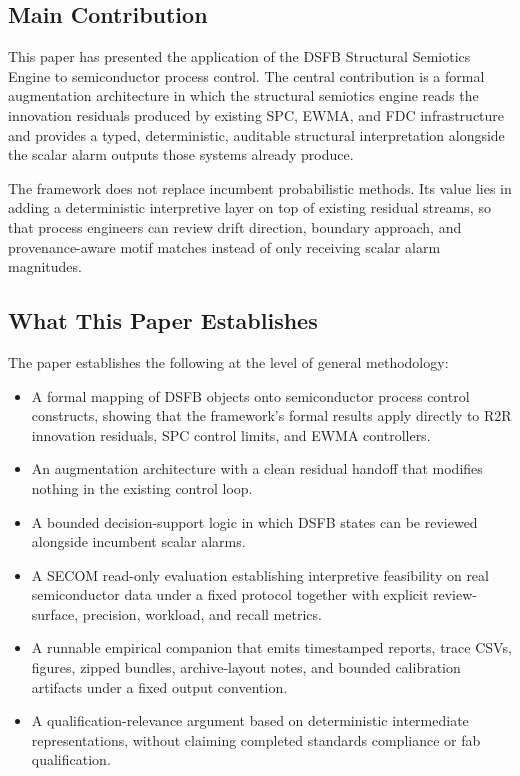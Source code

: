 \documentclass[11pt,letterpaper]{article}
\theoremstyle{scresult}
\begin{document}
\subsection{Main Contribution}

This paper has presented the application of the DSFB Structural Semiotics
Engine to semiconductor process control. The central contribution is a formal
augmentation architecture in which the structural semiotics engine reads the
innovation residuals produced by existing SPC, EWMA, and FDC infrastructure
and provides a typed, deterministic, auditable structural interpretation
alongside the scalar alarm outputs those systems already produce.

The framework does not replace incumbent probabilistic methods. Its value lies
in adding a deterministic interpretive layer on top of existing residual
streams, so that process engineers can review drift direction, boundary
approach, and provenance-aware motif matches instead of only receiving scalar
alarm magnitudes.

\subsection{What This Paper Establishes}

The paper establishes the following at the level of general methodology:

\begin{itemize}
  \item A formal mapping of DSFB objects onto semiconductor process control
        constructs, showing that the framework's formal results apply directly
        to R2R innovation residuals, SPC control limits, and EWMA controllers.
  \item An augmentation architecture with a clean residual handoff that
        modifies nothing in the existing control loop.
  \item A bounded decision-support logic in which DSFB states can be reviewed
        alongside incumbent scalar alarms.
  \item A SECOM read-only evaluation establishing interpretive feasibility on
        real semiconductor data under a fixed protocol together with explicit
        review-surface, precision, workload, and recall metrics.
  \item A runnable empirical companion that emits timestamped reports, trace
        CSVs, figures, zipped bundles, archive-layout notes, and bounded
        calibration artifacts under a fixed output convention.
  \item A qualification-relevance argument based on deterministic intermediate
        representations, without claiming completed standards compliance or fab
        qualification.
\end{itemize}
\end{document}
